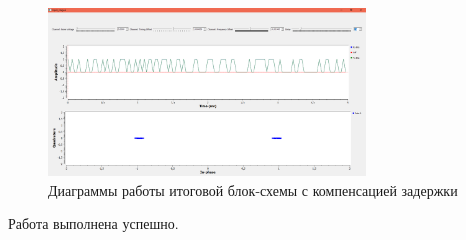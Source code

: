 \documentclass[12pt]{article}
\begin{document}
\begin{figure}[H]
    \centering
    \includegraphics[width=0.75\textwidth]{pics/a0000-img012.png}
    \caption{Диаграммы работы итоговой блок-схемы с компенсацией задержки}
\end{figure}

Работа выполнена успешно.
\end{document}

